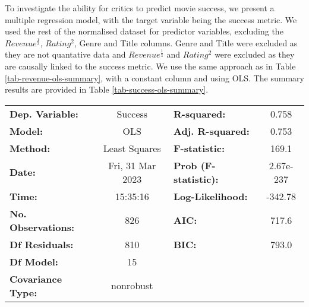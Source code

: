         To investigate the ability for critics to predict movie success, we present a multiple regression model,
            with the target variable being the success metric. 
        We used the rest of the normalised dataset for predictor variables, excluding the $Revenue^\frac{1}{3}$, $Rating^2$,
            Genre and Title columns.
        Genre and Title were excluded as they are not quantative data and $Revenue^\frac{1}{3}$ and $Rating^2$ were excluded
            as they are causally  linked to the success metric.
        We use the same approach as in Table \ref{tab-revenue-ols-summary}, with a constant column and using OLS.
        The summary results are provided in Table \ref{tab-success-ols-summary}.
        \begin{table}[h]
            \begin{center}
                \begin{tabular}{lclc}
                    \toprule
                    \textbf{Dep. Variable:}           &     Success      & \textbf{  R-squared:         } &     0.758   \\
                    \textbf{Model:}                   &       OLS        & \textbf{  Adj. R-squared:    } &     0.753   \\
                    \textbf{Method:}                  &  Least Squares   & \textbf{  F-statistic:       } &     169.1   \\
                    \textbf{Date:}                    & Fri, 31 Mar 2023 & \textbf{  Prob (F-statistic):} & 2.67e-237   \\
                    \textbf{Time:}                    &     15:35:16     & \textbf{  Log-Likelihood:    } &   -342.78   \\
                    \textbf{No. Observations:}        &         826      & \textbf{  AIC:               } &     717.6   \\
                    \textbf{Df Residuals:}            &         810      & \textbf{  BIC:               } &     793.0   \\
                    \textbf{Df Model:}                &          15      & \textbf{                     } &             \\
                    \textbf{Covariance Type:}         &    nonrobust     & \textbf{                     } &             \\
                    \bottomrule
                \end{tabular}
                \begin{tabular}{lcccccc}

\end{tabular}
\end{center}
\end{table}
